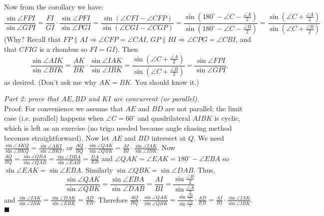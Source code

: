 \documentclass[11pt,a4paper]{article}
\begin{document}
\begin{enumerate}

Now from the corollary we have: $$\frac{\sin\angle FPI}{\sin\angle GPI}=\frac{FI}{GI}\cdot\frac{\sin\angle PFI}{\sin\angle PGI}=\frac{\sin (\angle CFI-\angle CFP)}{\sin(\angle CGI-\angle CGP)}=\dfrac{\sin (180^{\circ}-\angle C-\frac{\angle A}{2})}{\sin (180^{\circ}-\angle C-\frac{\angle B}{2})}=\dfrac{\sin (\angle C+\frac{\angle A}{2})}{\sin (\angle C+\frac{\angle B}{2})}$$ (Why? Recall that $FP\parallel AI\Rightarrow \angle CFP=\angle CAI$, $GP\parallel BI\Rightarrow\angle CPG=\angle CBI$, and that $CFIG$ is a rhombus so $FI=GI$). Then $$\frac{\sin\angle AIK}{\sin\angle BIK}=\frac{AK}{BK}\cdot\frac{\sin\angle IAK}{\sin\angle IBK}=\dfrac{\sin (\angle C+\frac{\angle A}{2})}{\sin (\angle C+\frac{\angle B}{2})}=\frac{\sin\angle FPI}{\sin\angle GPI},$$ as desired. (Don't ask me why $AK=BK$. You should know it.)
 
\emph{Part 2: prove that $AE, BD$ and $KI$ are concurrent (or parallel).}
\\Proof: For convenience we assume that $AE$ and $BD$ are not parallel; the limit case (i.e. parallel) happens when $\angle C=60^{\circ}$ and quadrilateral $AIBK$ is cyclic, which is left as an exercise (no trigo needed because angle chasing method becomes straightforward). Now let $AE$ and $BD$ intersect at $Q$. We need $\frac{\sin\angle AKQ}{\sin\angle BKQ}=\frac{\sin\angle AKI}{\sin\angle BKI}$, or $\frac{AQ}{BQ}\cdot\frac{\sin\angle QAK}{\sin\angle QBK}=\frac{AI}{BI}\cdot\frac{\sin\angle IAK}{\sin\angle IBK}$. Now $\frac{AQ}{BQ}=\frac{\sin\angle QBA}{\sin\angle QAB}=\frac{\sin\angle DBA}{\sin\angle EAB}=\frac{DA}{EB}$ and $\angle QAK=\angle EAK=180^{\circ}-\angle EBA$ so $\sin\angle EAK=\sin\angle EBA$. Similarly $\sin\angle QBK=\sin\angle DAB$. Thus, $$\frac{\sin\angle QAK}{\sin\angle QBK}=\frac{\sin\angle EBA}{\sin\angle DAB}=\frac{AI}{BI}=\dfrac{\sin\frac{\angle B}{2}}{\sin\frac{\angle A}{2}}$$ and $\frac{\sin\angle IAK}{\sin\angle IBK}=\frac{\sin\angle DAK}{\sin\angle EBK}=\frac{AD}{EB}.$ Therefore $\frac{AQ}{BQ}\cdot\frac{\sin\angle QAK}{\sin\angle QBK}=\frac{\sin\frac{\angle B}{2}}{\sin\frac{\angle A}{2}}\cdot\frac{AD}{EB}=\frac{AI}{BI}\cdot\frac{\sin\angle IAK}{\sin\angle IBK}$. $\blacksquare$


\end{enumerate}
\end{document}
